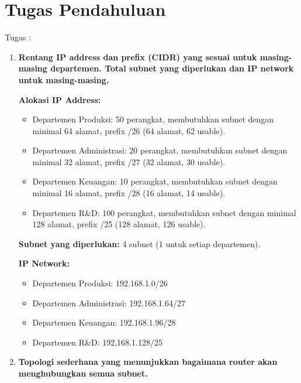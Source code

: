 \section{Tugas Pendahuluan}
Tugas :
\begin{enumerate}
	\item \textbf{Rentang IP address dan prefix (CIDR) yang sesuai untuk masing-masing departemen. Total subnet yang diperlukan dan IP network untuk masing-masing.}

	\textbf{Alokasi IP Address:}
	\begin{itemize}
		\item Departemen Produksi: 50 perangkat, membutuhkan subnet dengan minimal 64 alamat, prefix /26 (64 alamat, 62 usable).
		\item Departemen Administrasi: 20 perangkat, membutuhkan subnet dengan minimal 32 alamat, prefix /27 (32 alamat, 30 usable).
		\item Departemen Keuangan: 10 perangkat, membutuhkan subnet dengan minimal 16 alamat, prefix /28 (16 alamat, 14 usable).
		\item Departemen R\&D: 100 perangkat, membutuhkan subnet dengan minimal 128 alamat, prefix /25 (128 alamat, 126 usable).
	\end{itemize}
	
	\textbf{Subnet yang diperlukan:} 4 subnet (1 untuk setiap departemen).

	\textbf{IP Network:}
	\begin{itemize}
		\item Departemen Produksi: 192.168.1.0/26
		\item Departemen Administrasi: 192.168.1.64/27
		\item Departemen Keuangan: 192.168.1.96/28
		\item Departemen R\&D: 192.168.1.128/25
	\end{itemize}

	\item \textbf{Topologi sederhana yang menunjukkan bagaimana router akan menghubungkan semua subnet.}


\end{enumerate}
